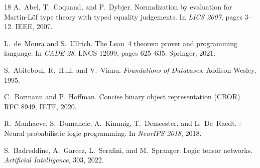 \documentclass[10pt,twocolumn,letterpaper]{article}
\begin{document}
\begin{thebibliography}{18}
A.~Abel, T.~Coquand, and P.~Dybjer.
\newblock Normalization by evaluation for {Martin-L\"{o}f} type theory with typed equality judgements.
\newblock In \emph{LICS 2007}, pages 3--12. IEEE, 2007.

L.~de~Moura and S.~Ullrich.
\newblock The {Lean~4} theorem prover and programming language.
\newblock In \emph{CADE-28}, LNCS 12699, pages 625--635. Springer, 2021.

S.~Abiteboul, R.~Hull, and V.~Vianu.
\newblock \emph{Foundations of Databases}.
\newblock Addison-Wesley, 1995.

C.~Bormann and P.~Hoffman.
\newblock Concise binary object representation ({CBOR}).
\newblock RFC 8949, IETF, 2020.

R.~Manhaeve, S.~Dumancic, A.~Kimmig, T.~Demeester, and L.~De~Raedt.
: Neural probabilistic logic programming.
\newblock In \emph{NeurIPS 2018}, 2018.

S.~Badreddine, A.~Garcez, L.~Serafini, and M.~Spranger.
\newblock Logic tensor networks.
\newblock \emph{Artificial Intelligence}, 303, 2022.

\end{thebibliography}
\end{document}
